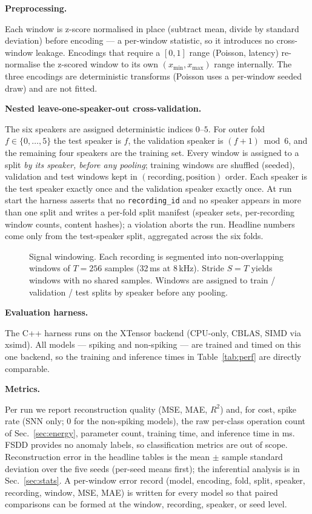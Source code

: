 \documentclass[conference]{IEEEtran}
\begin{document}
\textbf{Preprocessing.}
\par Each window is z-score normalised in place (subtract mean, divide by
standard deviation) before encoding --- a per-window statistic, so it introduces
no cross-window leakage. Encodings that require a $[0,1]$ range (Poisson,
latency) re-normalise the z-scored window to its own $(x_{\min}, x_{\max})$
range internally. The three encodings are deterministic transforms (Poisson uses
a per-window seeded draw) and are not fitted.

\textbf{Nested leave-one-speaker-out cross-validation.}
\par The six speakers are assigned deterministic indices $0$--$5$. For outer
fold $f \in \{0,\dots,5\}$ the test speaker is $f$, the validation speaker is
$(f+1)\bmod 6$, and the remaining four speakers are the training set. Every
window is assigned to a split \emph{by its speaker, before any pooling};
training windows are shuffled (seeded), validation and test windows kept in
$(\text{recording},\text{position})$ order. Each speaker is the test speaker
exactly once and the validation speaker exactly once. At run start the harness
asserts that no \texttt{recording\_id} and no speaker appears in more than one
split and writes a per-fold split manifest (speaker sets, per-recording window
counts, content hashes); a violation aborts the run. Headline numbers come only
from the test-speaker split, aggregated across the six folds.

\begin{figure}[!t]
\centering

\caption{Signal windowing. Each recording is segmented into non-overlapping
windows of $T=256$ samples (32\,ms at 8\,kHz). Stride $S=T$ yields
windows with no shared samples. Windows are assigned to train / validation /
test splits by speaker before any pooling.}
\label{fig:windowing}
\end{figure}

\textbf{Evaluation harness.}
\par The C++ harness \cite{furlan2026doi} runs on the XTensor backend
\cite{xtensor} (CPU-only, CBLAS, SIMD via xsimd). All models --- spiking and
non-spiking --- are trained and timed on this one backend, so the training and
inference times in Table~\ref{tab:perf} are directly comparable.

\textbf{Metrics.}
\par Per run we report reconstruction quality (MSE, MAE, $R^2$) and, for cost,
spike rate (SNN only; $0$ for the non-spiking models), the raw per-class
operation count of Sec.~\ref{sec:energy}, parameter count, training time, and
inference time in ms. FSDD provides no anomaly labels, so classification metrics
are out of scope. Reconstruction error in the headline tables is the mean $\pm$
sample standard deviation over the five seeds (per-seed means first); the
inferential analysis is in Sec.~\ref{sec:stats}. A per-window error record
(model, encoding, fold, split, speaker, recording, window, MSE, MAE) is written
for every model so that paired comparisons can be formed at the window,
recording, speaker, or seed level.
\end{document}

